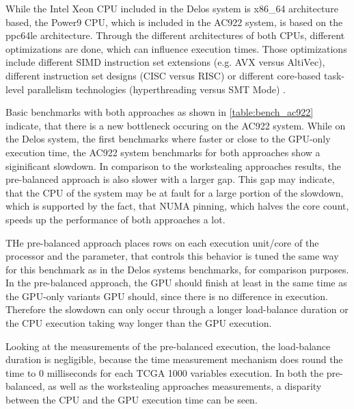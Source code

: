 While the Intel Xeon CPU included in the Delos system is x86\_64 architecture based, the Power9 CPU, which is included in the AC922 system, is based on the ppc64le architecture. Through the different architectures of both CPUs, different optimizations are done, which can influence execution times. Those optimizations include different SIMD instruction set extensions (e.g. AVX versus AltiVec), different instruction set designs (CISC versus RISC) or different core-based task-level parallelism technologies (hyperthreading versus SMT Mode) \cite{AnalysisX86Vs}.



Basic benchmarks with both approaches as shown in \ref{table:bench_ac922} indicate, that there is a new bottleneck occuring on the AC922 system. While on the Delos system, the first benchmarks where faster or close to the GPU-only execution time, the AC922 system  benchmarks for both approaches show a siginificant slowdown. In comparison to the workstealing approaches results, the pre-balanced approach is also slower with a larger gap. This gap may indicate, that the CPU of the system may be at fault for a large portion of the slowdown, which is supported by the fact, that NUMA pinning, which halves the core count, speeds up the performance of both approaches a lot.

THe pre-balanced approach places rows on each execution unit/core of the processor and the parameter, that controls this behavior is tuned the same way for this benchmark as in the Delos systems benchmarks, for comparison purposes.
In the pre-balanced approach, the GPU should finish at least in the same time as the GPU-only variants GPU should, since there is no difference in execution. Therefore the slowdown can only occur through a longer load-balance duration or the CPU execution taking way longer than the GPU execution.

Looking at the measurements of the pre-balanced execution, the load-balance duration is negligible, because the time measurement mechanism does round the time to 0 milliseconds for each TCGA 1000 variables execution. In both the pre-balanced, as well as the workstealing approaches measurements, a disparity between the CPU and the GPU execution time can be seen.


